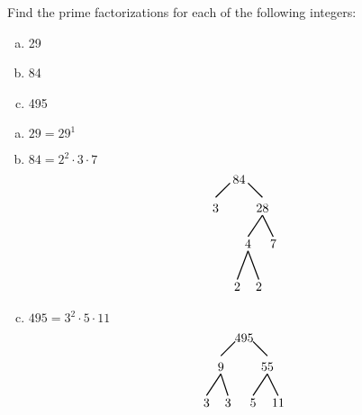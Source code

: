 \documentclass[12pt,letterpaper]{exam}
\begin{document}
\begin{questions}
\newpage
\question[10] Find the prime factorizations for each of the following integers:
        \begin{enumerate}[(a)]
        \item 29
        \item 84
        \item 495
        \end{enumerate} \pspace

\sol 
\begin{enumerate}[(a)]
\item $29= 29^1$ \pspace
        
\item $84= 2^2 \cdot 3 \cdot 7$
        	\[
        	\begin{tikzpicture}
        	\node at (-0.15,0) {$84$};
        	\draw[line width=0.03cm] (-0.4,-0.1) -- (-0.8,-0.5);
        	\node at (-0.8,-0.8) {$3$};
        	\draw[line width=0.03cm]  (0.1,-0.1) -- (0.5,-0.5);
        	\node at (0.5,-0.8) {$28$};
        	
        	\draw[line width=0.03cm] (0.5,-1) -- (0.1,-1.6);
        	\node at (0.1,-1.8) {$4$};
        	\draw[line width=0.03cm] (0.5,-1) -- (0.8,-1.6);
        	\node at (0.8,-1.8) {$7$};
		
        	\draw[line width=0.03cm] (0.4,-2.8) -- (0.1,-2);
        	\node at (0.4,-3.0) {$2$};
	\draw[line width=0.03cm] (-0.2,-2.8) -- (0.1,-2);
        	\node at (-0.2,-3.0) {$2$};		
        	\end{tikzpicture}
        	\] \pspace
	
\item $495= 3^2 \cdot 5 \cdot 11$
        	\[
        	\begin{tikzpicture}
        	\node at (-0.15,0) {$495$};
        	\draw[line width=0.03cm] (-0.4,-0.1) -- (-0.8,-0.5);
        	\node at (-0.8,-0.8) {$9$};
        	\draw[line width=0.03cm]  (0.1,-0.1) -- (0.5,-0.5);
        	\node at (0.5,-0.8) {$55$};
        		
        	\draw[line width=0.03cm] (-0.8,-1) -- (-1.2,-1.6);
        	\node at (-1.2,-1.8) {$3$};
        	\draw[line width=0.03cm] (-0.8,-1) -- (-0.6,-1.6);
        	\node at (-0.6,-1.8) {$3$};
        	
        	\draw[line width=0.03cm] (0.5,-1) -- (0.1,-1.6);
        	\node at (0.1,-1.8) {$5$};
        	\draw[line width=0.03cm] (0.5,-1) -- (0.8,-1.6);
        	\node at (0.8,-1.8) {$11$};
        	\end{tikzpicture}
        	\]
\end{enumerate}




\end{questions}
\end{document}
